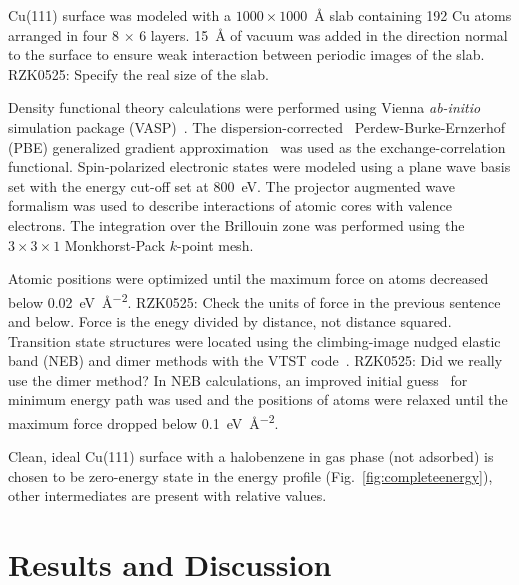 \documentclass[%
 reprint,
 amsmath,amssymb,
 aps,
prb,
floatfix,
]{revtex4-2}
\newcommand{\lock}{\color{red}}
\newcommand{\lock}{\color{red}}
\newcommand{\comm}{\color{Purple}} %
\begin{document}
{\lock

Cu(111) surface was modeled with a $1000 \times 1000$~\si{\angstrom} slab containing 192 Cu atoms arranged in four 8 $\times$ 6 layers. \SI{15}{\angstrom} of vacuum was added in the direction normal to the surface to ensure weak interaction between periodic images of the slab. {\comm RZK0525: Specify the real size of the slab.}

Density functional theory calculations were performed using Vienna \emph{ab-initio} simulation package (VASP)~\cite{RZK}. The dispersion-corrected~\cite{RZK-DFT-D3} Perdew-Burke-Ernzerhof (PBE) generalized gradient approximation~\cite{RZK} was used as the exchange-correlation functional. Spin-polarized electronic states were modeled using a plane wave basis set with the energy cut-off set at \SI{800}{\electronvolt}. The projector augmented wave formalism was used to describe interactions of atomic cores with valence electrons. The integration over the Brillouin zone was performed using the $3\times 3 \times1$ Monkhorst-Pack $k$-point mesh. 

Atomic positions were optimized until the maximum force on atoms decreased below \SI{0.02}{\electronvolt\per\square\angstrom}. 
{\comm RZK0525: Check the units of force in the previous sentence and below. Force is the enegy divided by distance, not distance squared.}
%
Transition state structures were located using the climbing-image nudged elastic band (NEB) and dimer methods with the VTST code~\cite{ullmann_59}. {\comm RZK0525: Did we really use the dimer method?}
%
In NEB calculations, an improved initial guess~\cite{ullmann_60, ullmann_99} for minimum energy path was used and the positions of atoms were relaxed until the maximum force dropped below \SI{0.1}{\electronvolt\per\square\angstrom}.


}

{\comm 
Clean, ideal Cu(111) surface with a halobenzene in gas phase (not adsorbed) is chosen to be zero-energy state in the energy profile (Fig.~\ref{fig:completeenergy}), other intermediates are present with relative values.}

\section{Results and Discussion}
\end{document}
